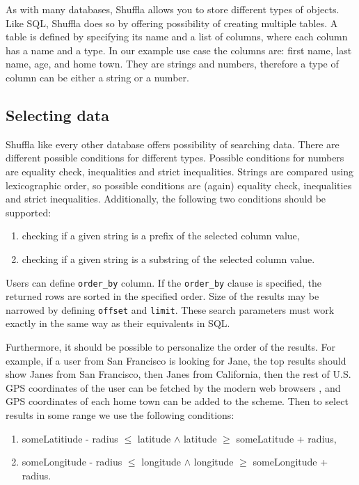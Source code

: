 \documentclass[10pt,a4paper]{article}
\begin{document}
As with many databases, Shuffla allows you to store different types of objects. Like SQL, Shuffla does so by offering possibility of creating multiple tables. A table is defined by specifying its name and a list of columns, where each column has a name and a type. In our example use case the columns are: first name, last name, age, and home town. They are strings and numbers, therefore a type of column can be either a string or a number.

\subsection{Selecting data}

Shuffla like every other database offers possibility of searching data. There are different possible conditions for different types. Possible conditions for numbers are equality check, inequalities and strict inequalities. Strings are compared using lexicographic order, so possible conditions are (again) equality check, inequalities and strict inequalities. Additionally, the following two conditions should be supported:
\begin{enumerate}
\item checking if a given string is a prefix of the selected column value,
\item checking if a given string is a substring of the selected column value. 
\end{enumerate}

Users can define \verb|order_by| column. If the \verb|order_by| clause is specified, the returned rows are sorted in the specified order. Size of the results may be narrowed by defining \verb|offset| and \verb|limit|. These search parameters must work exactly in the same way as their equivalents in SQL.

Furthermore, it should be possible to personalize the order of the results. For example, if a user from San Francisco is looking for Jane, the top results should show Janes from San Francisco, then Janes from California, then the rest of U.S. GPS coordinates of the user can be fetched by the modern web browsers \cite{FETCHGPS}, and GPS coordinates of each home town can be added to the scheme. Then to select results in some range we use the following conditions:   
\begin{enumerate}
\item{someLatitiude - radius $\leq$ latitude $\wedge$ latitude $\geq$ someLatitude + radius},
\item{someLongitude - radius $\leq$ longitude $\wedge$ longitude $\geq$ someLongitude + radius}.
\end{enumerate}
\end{document}
